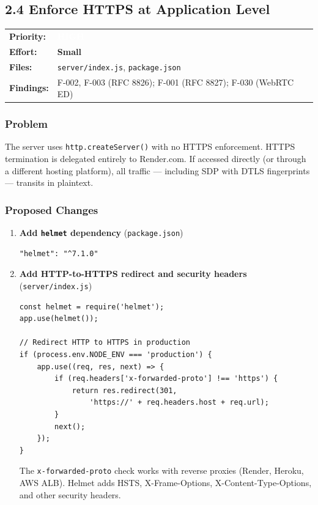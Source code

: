 \documentclass[11pt,letterpaper]{article}
\newcommand{\prihigh}{\colorbox{major}{\textcolor{white}{\small\textbf{HIGH}}}}
\newcommand{\effsmall}{\colorbox{compliant!30}{\small\textbf{Small}}}
\begin{document}
\newpage

\subsection{2.4 Enforce HTTPS at Application Level}

\begin{tabular}{ll}
\textbf{Priority:} & \prihigh \\
\textbf{Effort:} & \effsmall \\
\textbf{Files:} & \texttt{server/index.js}, \texttt{package.json} \\
\textbf{Findings:} & F-002, F-003 (RFC 8826); F-001 (RFC 8827); F-030 (WebRTC ED) \\
\end{tabular}

\subsubsection{Problem}

The server uses \texttt{http.createServer()} with no HTTPS enforcement. HTTPS termination is delegated entirely to Render.com. If accessed directly (or through a different hosting platform), all traffic --- including SDP with DTLS fingerprints --- transits in plaintext.

\subsubsection{Proposed Changes}

\begin{enumerate}[leftmargin=2em]
    \item \textbf{Add \texttt{helmet} dependency} (\texttt{package.json})

    \begin{verbatim}
"helmet": "^7.1.0"
    \end{verbatim}

    \item \textbf{Add HTTP-to-HTTPS redirect and security headers} (\texttt{server/index.js})

    \begin{verbatim}
const helmet = require('helmet');
app.use(helmet());

// Redirect HTTP to HTTPS in production
if (process.env.NODE_ENV === 'production') {
    app.use((req, res, next) => {
        if (req.headers['x-forwarded-proto'] !== 'https') {
            return res.redirect(301,
                'https://' + req.headers.host + req.url);
        }
        next();
    });
}
    \end{verbatim}

    The \texttt{x-forwarded-proto} check works with reverse proxies (Render, Heroku, AWS ALB). Helmet adds HSTS, X-Frame-Options, X-Content-Type-Options, and other security headers.
\end{enumerate}
\end{document}
